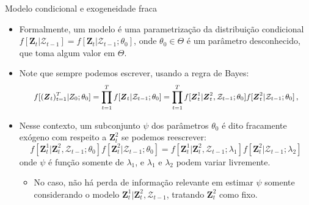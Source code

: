\documentclass[11pt]{beamer}
\begin{document}
\begin{frame}{Modelo condicional e exogeneidade fraca}
	\begin{itemize}
		\item Formalmente, um modelo é uma parametrização da distribuição condicional  $f[\boldsymbol{Z}_t|\mathcal{Z}_{t-1}] = f[\boldsymbol{Z}_t|\mathcal{Z}_{t-1};\theta_0] $, onde $\theta_0 \in \Theta$ é um parâmetro desconhecido, que toma algum valor em $\Theta$.
		
		\item Note que sempre podemos escrever, usando a regra de Bayes:
			$$\small f[(\boldsymbol{Z}_t)_{t=1}^T|Z_0;\theta_0] = \prod_{t=1}^T f[\boldsymbol{Z}_t|\mathcal{Z}_{t-1};\theta_0] = \prod_{t=1}^T f[\boldsymbol{Z}_t^1|\boldsymbol{Z}^2_t,\mathcal{Z}_{t-1};\theta_0] f[\boldsymbol{Z}_t^2|\mathcal{Z}_{t-1};\theta_0] \, ,$$
		\item Nesse contexto, um subconjunto $\psi$ dos parâmetros $\theta_0$ é dito {\color{blue}fracamente exógeno com respeito a $\boldsymbol{Z}^2_t$} se podemos reescrever:
		$$f[\boldsymbol{Z}_t^1|\boldsymbol{Z}^2_t,\mathcal{Z}_{t-1};\theta_0] f[\boldsymbol{Z}_t^2|\mathcal{Z}_{t-1};\theta_0]  = f[\boldsymbol{Z}_t^1|\boldsymbol{Z}^2_t,\mathcal{Z}_{t-1};\lambda_1] f[\boldsymbol{Z}_t^2|\mathcal{Z}_{t-1};\lambda_2]  $$
		onde $\psi$ é  função somente de $\lambda_1$, e $\lambda_1$ e $\lambda_2$ podem variar {\color{blue}livremente}.
		\begin{itemize}
			\item No caso, não há perda de informação relevante em estimar $\psi$ somente considerando o modelo $\boldsymbol{Z}_t^1|\boldsymbol{Z}^2_t,\mathcal{Z}_{t-1}$, tratando $\boldsymbol{Z}^2_t$ como fixo.

		\end{itemize}
	\end{itemize}
\end{frame}
\end{document}
